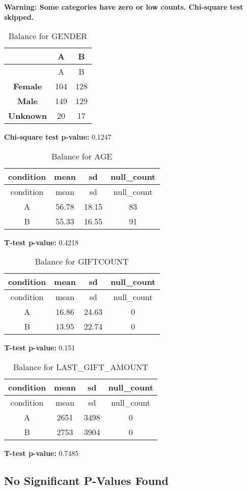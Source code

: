 \documentclass[
]{article}
\begin{document}
\textbf{Warning: Some categories have zero or low counts. Chi-square
test skipped.} \pagebreak

\begin{longtable}[]{@{}ccc@{}}
\caption{Balance for GENDER}\tabularnewline
\toprule\noalign{}
~ & A & B \\
\midrule\noalign{}
\endfirsthead
\toprule\noalign{}
~ & A & B \\
\midrule\noalign{}
\endhead
\bottomrule\noalign{}
\endlastfoot
\textbf{Female} & 104 & 128 \\
\textbf{Male} & 149 & 129 \\
\textbf{Unknown} & 20 & 17 \\
\end{longtable}

\textbf{Chi-square test p-value:} 0.1247\\
\pagebreak

\begin{longtable}[]{@{}cccc@{}}
\caption{Balance for AGE}\tabularnewline
\toprule\noalign{}
condition & mean & sd & null\_count \\
\midrule\noalign{}
\endfirsthead
\toprule\noalign{}
condition & mean & sd & null\_count \\
\midrule\noalign{}
\endhead
\bottomrule\noalign{}
\endlastfoot
A & 56.78 & 18.15 & 83 \\
B & 55.33 & 16.55 & 91 \\
\end{longtable}

\textbf{T-test p-value:} 0.4218\\
\pagebreak

\begin{longtable}[]{@{}cccc@{}}
\caption{Balance for GIFTCOUNT}\tabularnewline
\toprule\noalign{}
condition & mean & sd & null\_count \\
\midrule\noalign{}
\endfirsthead
\toprule\noalign{}
condition & mean & sd & null\_count \\
\midrule\noalign{}
\endhead
\bottomrule\noalign{}
\endlastfoot
A & 16.86 & 24.63 & 0 \\
B & 13.95 & 22.74 & 0 \\
\end{longtable}

\textbf{T-test p-value:} 0.151\\
\pagebreak

\begin{longtable}[]{@{}cccc@{}}
\caption{Balance for LAST\_GIFT\_AMOUNT}\tabularnewline
\toprule\noalign{}
condition & mean & sd & null\_count \\
\midrule\noalign{}
\endfirsthead
\toprule\noalign{}
condition & mean & sd & null\_count \\
\midrule\noalign{}
\endhead
\bottomrule\noalign{}
\endlastfoot
A & 2651 & 3498 & 0 \\
B & 2753 & 3904 & 0 \\
\end{longtable}

\textbf{T-test p-value:} 0.7485\\
\pagebreak \clearpage

\subsection{No Significant P-Values
Found}\label{no-significant-p-values-found}
\end{document}
